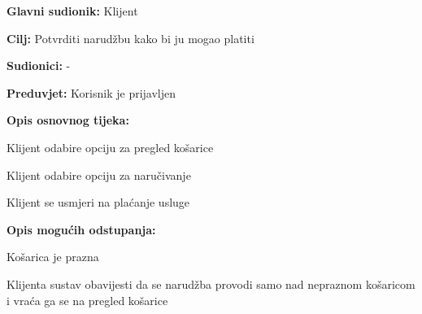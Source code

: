 				\noindent {}
				\begin{packed_item}
					
					\item \textbf{Glavni sudionik: } Klijent
					\item  \textbf{Cilj:} Potvrditi narudžbu kako bi ju mogao platiti
					\item  \textbf{Sudionici:} -
					\item  \textbf{Preduvjet:} Korisnik je prijavljen
					\item  \textbf{Opis osnovnog tijeka:}
					
					\item[] \begin{packed_enum}
						
						\item Klijent odabire opciju za pregled košarice
						\item Klijent odabire opciju za naručivanje
						\item Klijent se usmjeri na plaćanje usluge
						
					\end{packed_enum}
					
					\item  \textbf{Opis mogućih odstupanja:}
					
					\item[] \begin{packed_item}
						
						\item[2.a] Košarica je prazna
						\item[] \begin{packed_enum}
							
							\item Klijenta sustav obavijesti da se narudžba provodi samo nad nepraznom košaricom i vraća ga se na pregled košarice
							
						\end{packed_enum}
						
					\end{packed_item}
				\end{packed_item}
			
